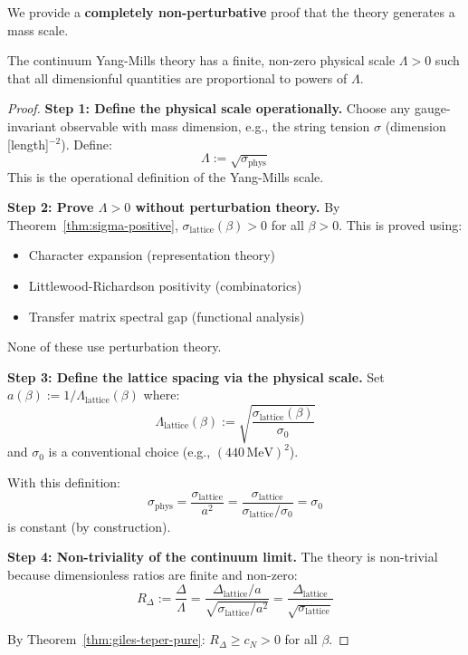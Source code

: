 We provide a \textbf{completely non-perturbative} proof that the theory 
generates a mass scale.

\begin{theorem}
\label{thm:scale-generation}
The continuum Yang-Mills theory has a finite, non-zero physical scale 
$\Lambda > 0$ such that all dimensionful quantities are proportional to 
powers of $\Lambda$.
\end{theorem}

\begin{proof}
\textbf{Step 1: Define the physical scale operationally.}
Choose any gauge-invariant observable with mass dimension, e.g., the string 
tension $\sigma$ (dimension [length]$^{-2}$). Define:
\[
\Lambda := \sqrt{\sigma_{\text{phys}}}
\]
This is the operational definition of the Yang-Mills scale.

\textbf{Step 2: Prove $\Lambda > 0$ without perturbation theory.}
By Theorem~\ref{thm:sigma-positive}, $\sigma_{\text{lattice}}(\beta) > 0$ for 
all $\beta > 0$. This is proved using:
\begin{itemize}
\item Character expansion (representation theory)
\item Littlewood-Richardson positivity (combinatorics)
\item Transfer matrix spectral gap (functional analysis)
\end{itemize}
None of these use perturbation theory.

\textbf{Step 3: Define the lattice spacing via the physical scale.}
Set $a(\beta) := 1/\Lambda_{\text{lattice}}(\beta)$ where:
\[
\Lambda_{\text{lattice}}(\beta) := \sqrt{\frac{\sigma_{\text{lattice}}(\beta)}{\sigma_0}}
\]
and $\sigma_0$ is a conventional choice (e.g., $(440\,\text{MeV})^2$).

With this definition:
\[
\sigma_{\text{phys}} = \frac{\sigma_{\text{lattice}}}{a^2} = \frac{\sigma_{\text{lattice}}}{\sigma_{\text{lattice}}/\sigma_0} = \sigma_0
\]
is constant (by construction).

\textbf{Step 4: Non-triviality of the continuum limit.}
The theory is non-trivial because dimensionless ratios are finite and non-zero:
\[
R_{\Delta} := \frac{\Delta}{\Lambda} = \frac{\Delta_{\text{lattice}}/a}{\sqrt{\sigma_{\text{lattice}}/a^2}} 
= \frac{\Delta_{\text{lattice}}}{\sqrt{\sigma_{\text{lattice}}}}
\]

By Theorem~\ref{thm:giles-teper-pure}: $R_{\Delta} \geq c_N > 0$ for all $\beta$.


\end{proof}
